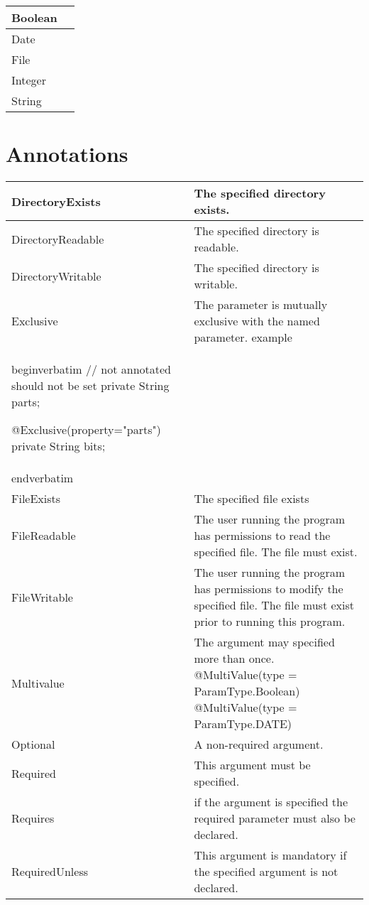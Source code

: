 \documentclass[a4paper,10pt]{article}
\begin{document}
\begin{tabular}{l | l }
  Boolean & \\ \hline
  Date & \\ \hline
  File & \\ \hline
  Integer & \\ \hline
  String & \\ \hline
\end{tabular}
\section{Annotations}

 \begin{tabular}{  l | l }
    DirectoryExists & The specified directory exists. \\ \hline
   DirectoryReadable &  The specified directory is readable. \\ \hline
    DirectoryWritable & The specified directory is writable. \\ \hline
    Exclusive  & The parameter is mutually exclusive with the named parameter.  example 	
                \\begin{verbatim}
                 // not annotated should not be set
		private String parts;
		
		@Exclusive(property="parts")
		private String bits; 
                \\end{verbatim}
	
	        \\ \hline
    FileExists & The specified file exists\\  \hline
    FileReadable & The user running the program has permissions to read the specified file.  
                   The file must exist.\\ \hline
    FileWritable & The user running the program has permissions to modify the specified file.
                   The file must exist prior to running this program.\\ \hline
    Multivalue & The argument may specified more than once.
           @MultiValue(type = ParamType.Boolean)
           @MultiValue(type = ParamType.DATE) \\ \hline

    Optional & A non-required argument.\\ \hline
    Required & This argument must be specified.\\ \hline
    Requires &  if the argument is specified the required parameter must also be declared.\\ \hline
    RequiredUnless & This argument is mandatory if the specified argument is not declared. \\ \hline
    
    \end{tabular}
\end{document}
